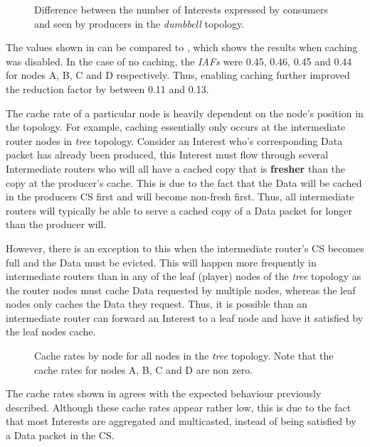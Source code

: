\begin{figure}[H]
    \centering
    \caption{Difference between the number of Interests expressed by consumers and seen by producers in the \textit{dumbbell} topology.}
    \label{fig:eval:caching:interest-agg-dumbbell}
\end{figure}

The values shown in  can be compared to , which shows the results when caching was disabled. In the case of no caching, the \textit{IAFs} were 0.45, 0.46, 0.45 and 0.44 for nodes A, B, C and D respectively. Thus, enabling caching further improved the reduction factor by between 0.11 and 0.13.

The cache rate of a particular node is heavily dependent on the node's position in the topology. For example, caching essentially only occurs at the intermediate router nodes in \textit{tree} topology. Consider an Interest who's corresponding Data packet has already been produced, this Interest must flow through several Intermediate routers who will all have a cached copy that is \textbf{fresher} than the copy at the producer's cache. This is due to the fact that the Data will be cached in the producers CS first and will become non-fresh first. Thus, all intermediate routers will typically be able to serve a cached copy of a Data packet for longer than the producer will. 

However, there is an exception to this when the intermediate router's CS becomes full and the Data must be evicted. This will happen more frequently in intermediate routers than in any of the leaf (player) nodes of the \textit{tree} topology as the router nodes must cache Data requested by multiple nodes, whereas the leaf nodes only caches the Data they request. Thus, it is possible than an intermediate router can forward an Interest to a leaf node and have it satisfied by the leaf nodes cache.

\begin{figure}[H]
    \centering
    \caption{Cache rates by node for all nodes in the \textit{tree} topology. Note that the cache rates for nodes A, B, C and D are non zero.}
    \label{fig:eval:caching:cache-rate-tree}
\end{figure}

The cache rates shown in  agrees with the expected behaviour previously described. Although these cache rates appear rather low, this is due to the fact that most Interests are aggregated and multicasted, instead of being satisfied by a Data packet in the CS.

